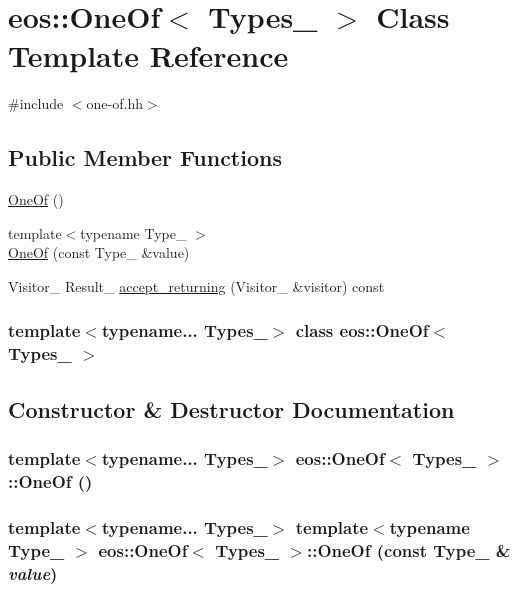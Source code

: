 \hypertarget{classeos_1_1OneOf}{
\section{eos::OneOf$<$ Types\_\- $>$ Class Template Reference}
\label{classeos_1_1OneOf}
}


{\ttfamily \#include $<$one-\/of.hh$>$}\subsection*{Public Member Functions}
\begin{DoxyCompactItemize}
\item 
\hyperlink{classeos_1_1OneOf_a1765098679d8661eac6ee994f4b4902a}{OneOf} ()
\item 
{\footnotesize template$<$typename Type\_\- $>$ }\\\hyperlink{classeos_1_1OneOf_aeb5c2a79d64af9958071e3f304672aa4}{OneOf} (const Type\_\- \&value)
\item 
Visitor\_\- Result\_\- \hyperlink{classeos_1_1OneOf_a2d12b36c583fe6967f6a31ac65b066c9}{accept\_\-returning} (Visitor\_\- \&visitor) const 
\end{DoxyCompactItemize}
\subsubsection*{template$<$typename... Types\_\-$>$ class eos::OneOf$<$ Types\_\- $>$}



\subsection{Constructor \& Destructor Documentation}
\hypertarget{classeos_1_1OneOf_a1765098679d8661eac6ee994f4b4902a}{
\subsubsection[{OneOf}]{\setlength{\rightskip}{0pt plus 5cm}template$<$typename... Types\_\-$>$ {\bf eos::OneOf}$<$ Types\_\- $>$::{\bf OneOf} ()}}
\label{classeos_1_1OneOf_a1765098679d8661eac6ee994f4b4902a}
\hypertarget{classeos_1_1OneOf_aeb5c2a79d64af9958071e3f304672aa4}{
\subsubsection[{OneOf}]{\setlength{\rightskip}{0pt plus 5cm}template$<$typename... Types\_\-$>$ template$<$typename Type\_\- $>$ {\bf eos::OneOf}$<$ Types\_\- $>$::{\bf OneOf} (const Type\_\- \& {\em value})}}
\label{classeos_1_1OneOf_aeb5c2a79d64af9958071e3f304672aa4}


